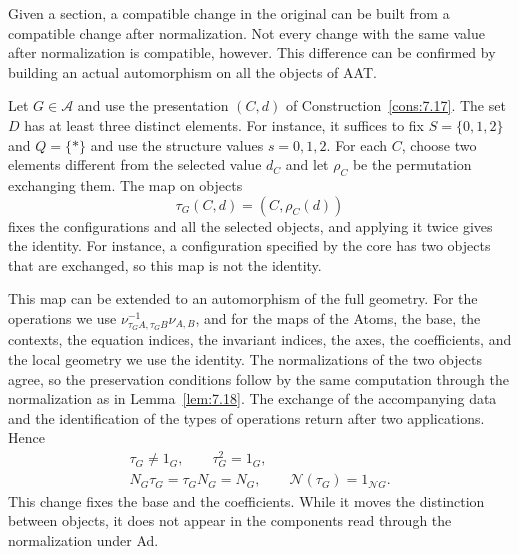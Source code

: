 Given a section, a compatible change in the original can be built from a compatible change
after normalization.
Not every change with the same value after normalization is compatible, however.
This difference can be confirmed by building an actual automorphism on all the objects of
AAT.

\begin{construction}\label{cons:7.20}

Let $G\in\mathcal A$ and use the presentation $(C,d)$ of Construction~\ref{cons:7.17}.
The set $D$ has at least three distinct elements.
For instance, it suffices to fix $S=\{0,1,2\}$ and $Q=\{*\}$ and use the structure values
$s=0,1,2$.
For each $C$, choose two elements different from the selected value $d_C$ and let $\rho_C$
be the permutation exchanging them.
The map on objects
\begin{equation*}
\tau_G(C,d)=(C,\rho_C(d))
\tag{7.32}\label{eq:7.32}
\end{equation*}
fixes the configurations and all the selected objects, and applying it twice gives the
identity.
For instance, a configuration specified by the core has two objects that are exchanged, so
this map is not the identity.

This map can be extended to an automorphism of the full geometry.
For the operations we use $\nu_{\tau_G A,\tau_G B}^{-1}\nu_{A,B}$, and for the maps of the
Atoms, the base, the contexts, the equation indices, the invariant indices, the axes, the
coefficients, and the local geometry we use the identity.
The normalizations of the two objects agree, so the preservation conditions follow by the
same computation through the normalization as in Lemma~\ref{lem:7.18}.
The exchange of the accompanying data and the identification of the types of operations
return after two applications. Hence
\begin{equation*}
\begin{gathered}
\tau_G\ne1_G,\qquad \tau_G^2=1_G,\\
N_G\tau_G=\tau_GN_G=N_G,\qquad
\mathcal N(\tau_G)=1_{\mathcal N G}.
\end{gathered}
\tag{7.33}\label{eq:7.33}
\end{equation*}
This change fixes the base and the coefficients.
While it moves the distinction between objects, it does not appear in the components read
through the normalization under Ad.

\end{construction}

